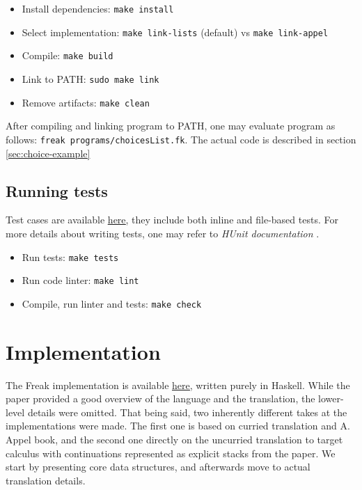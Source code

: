 \documentclass{article}
\theoremstyle{definition}
\theoremstyle{lemma}
\theoremstyle{observation}
\theoremstyle{theorem}
\begin{document}
    \begin{itemize}
        \item Install dependencies: \verb!make install!
        \item Select implementation: \verb!make link-lists! (default) vs \verb!make link-appel!
        \item Compile: \verb!make build!
        \item Link to PATH: \verb!sudo make link!
        \item Remove artifacts: \verb!make clean!
    \end{itemize}

    After compiling and linking program to PATH, one may evaluate program as
    follows: \verb!freak programs/choicesList.fk!. The actual code is described in section \ref{sec:choice-example}

    \subsection{Running tests}

    Test cases are available \href{https://github.com/Tomatosoup97/freak/blob/master/src/Tests.hs}{\underline{here}},
    they include both inline and file-based tests. For more details about
    writing tests, one may refer to \textit{HUnit documentation} \cite{hunit-docs}. \\

    \begin{itemize}
        \item Run tests: \verb!make tests!
        \item Run code linter: \verb!make lint!
        \item Compile, run linter and tests: \verb!make check!
    \end{itemize}

\section{Implementation}
\label{sec:implementation}

    The Freak implementation is available \href{https://github.com/Tomatosoup97/freak}{\underline{here}},
    written purely in Haskell. While the paper provided a good overview of the
    language and the translation, the lower-level details were omitted. That
    being said, two inherently different takes at the implementations were made.
    The first one is based on curried translation and A. Appel \cite{appel-continuations}
    book, and the second one directly on the uncurried translation to target
    calculus with continuations represented as explicit stacks from the paper.
    We start by presenting core data structures, and afterwards move to actual
    translation details.
\end{document}
